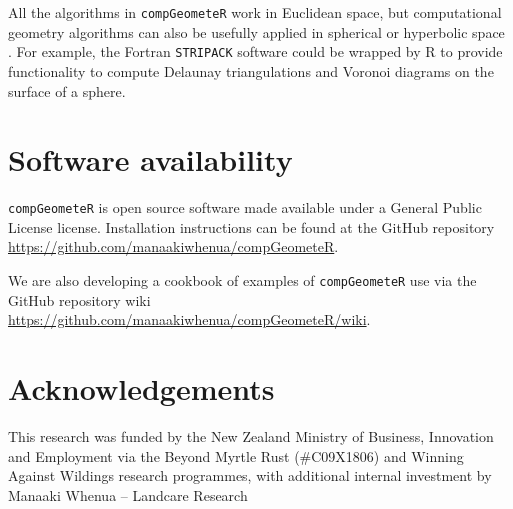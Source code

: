 \documentclass[12pt, a4paper]{article}
\begin{document}
All the algorithms in \texttt{compGeometeR} work in Euclidean space, but computational geometry algorithms can also be usefully applied in spherical or hyperbolic space \citep{gowers-2003}.  For example, the Fortran \texttt{STRIPACK} software \citep{renka-1997} could be wrapped by R to provide functionality to compute Delaunay triangulations and Voronoi diagrams on the surface of a sphere.

\section{Software availability}

\texttt{compGeometeR} is open source software made available under a General Public License license. Installation instructions can be found at the GitHub repository \url{https://github.com/manaakiwhenua/compGeometeR}.

We are also developing a cookbook of examples of \texttt{compGeometeR} use via the GitHub repository wiki \url{https://github.com/manaakiwhenua/compGeometeR/wiki}.

\section{Acknowledgements}

This research was funded by the New Zealand Ministry of Business, Innovation and Employment via the Beyond Myrtle Rust (\#C09X1806) and Winning Against Wildings research programmes, with additional internal investment by Manaaki Whenua -- Landcare Research



\end{document}
